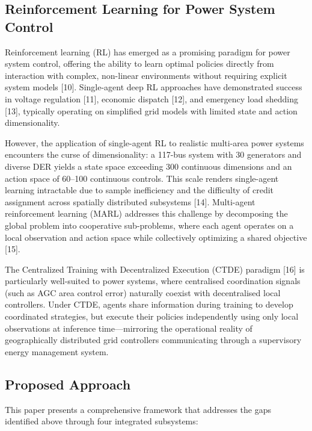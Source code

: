 \documentclass[conference]{IEEEtran}
\begin{document}
\subsection{Reinforcement Learning for Power System Control}

Reinforcement learning (RL) has emerged as a promising paradigm for power system control, offering the ability to learn optimal policies directly from interaction with complex, non-linear environments without requiring explicit system models [10]. Single-agent deep RL approaches have demonstrated success in voltage regulation [11], economic dispatch [12], and emergency load shedding [13], typically operating on simplified grid models with limited state and action dimensionality.

However, the application of single-agent RL to realistic multi-area power systems encounters the curse of dimensionality: a 117-bus system with 30 generators and diverse DER yields a state space exceeding 300 continuous dimensions and an action space of 60--100 continuous controls. This scale renders single-agent learning intractable due to sample inefficiency and the difficulty of credit assignment across spatially distributed subsystems [14]. Multi-agent reinforcement learning (MARL) addresses this challenge by decomposing the global problem into cooperative sub-problems, where each agent operates on a local observation and action space while collectively optimizing a shared objective [15].

The Centralized Training with Decentralized Execution (CTDE) paradigm [16] is particularly well-suited to power systems, where centralised coordination signals (such as AGC area control error) naturally coexist with decentralised local controllers. Under CTDE, agents share information during training to develop coordinated strategies, but execute their policies independently using only local observations at inference time---mirroring the operational reality of geographically distributed grid controllers communicating through a supervisory energy management system.

\subsection{Proposed Approach}

This paper presents a comprehensive framework that addresses the gaps identified above through four integrated subsystems:
\end{document}
